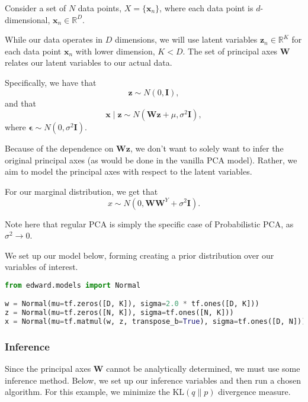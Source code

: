 Consider a set of $N$ data points, $X = \{\mathbf{x}_n\}$, where each
data point is $d$-dimensional, $\mathbf{x}_n \in \mathbb{R}^D$.

While our data operates in $D$ dimensions, we will use latent variables
$\mathbf{z}_n \in \mathbb{R}^K$ for each data point $\mathbf{x}_n$
with lower dimension, $K < D$. The set of principal axes
$\mathbf{W}$ relates our latent variables to our actual data.

Specifically, we have that
\begin{equation*}
\mathbf{z} \sim N(0, \mathbf{I}),
\end{equation*}
and that
\begin{equation*}
\mathbf{x} \mid \mathbf{z} \sim N(\mathbf{Wz} + \mu, \sigma^2\mathbf{I}),
\end{equation*}
where $\mathbf{\epsilon} \sim N(0, \sigma^2\mathbf{I})$.

Because of the dependence on $\mathbf{Wz}$, we don't want to solely
want to infer the original principal axes (as would be done in the
vanilla PCA model). Rather, we aim to model the principal axes with
respect to the latent variables.

For our marginal distribution, we get that
\begin{equation*}
x \sim N(0, \mathbf{W}\mathbf{W}^Y + \sigma^2\mathbf{I}).
\end{equation*}

Note here that regular PCA is simply the specific case of
Probabilistic PCA, as $\sigma^2 \to 0$.

We set up our model below, forming creating a prior distribution over
our variables of interest.

\begin{lstlisting}[language=Python]
from edward.models import Normal

w = Normal(mu=tf.zeros([D, K]), sigma=2.0 * tf.ones([D, K]))
z = Normal(mu=tf.zeros([N, K]), sigma=tf.ones([N, K]))
x = Normal(mu=tf.matmul(w, z, transpose_b=True), sigma=tf.ones([D, N]))

\end{lstlisting}

\subsubsection{Inference}

Since the principal axes $\mathbf{W}$ cannot be analytically
determined, we must use some inference method. Below, we set up our
inference variables and then run a chosen algorithm. For this
example, we minimize the $\text{KL}(q\|p)$ divergence measure.

